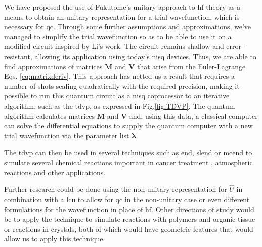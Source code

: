 \documentclass{aux/ttuthes2007}
\begin{document}
We have proposed the use of Fukutome's  unitary approach to \gls{hf} theory as a means to obtain an unitary representation for a trial wavefunction, which is necessary for \gls{qc}.
Through some further assumptions and approximations, we've managed to simplify the trial wavefunction so as to be able to use it on a modified circuit inspired by Li's  work. The circuit remains shallow and error-resistant, allowing its application using today's \gls{nisq} devices.
Thus, we are able to find approximations of matrices $\bm M$ and $\bm V$ that arise from the Euler-Lagrange Eqs. \ref{eq:matrixderiv}.
This approach has netted us a result that requires a number of shots scaling quadratically with the required precision, making it possible to run this quantum circuit as a \gls{nisq} coprocessor to an iterative algorithm, such as the \gls{tdvp}, as expressed in Fig.\ref{fig:TDVP}.
The quantum algorithm calculates matrices $\bm M$ and $\bm V$ and, using this data, a classical computer can solve the differential equations to supply the quantum computer with a new trial wavefunction via the parameter list $\bm \lambda$.

The \gls{tdvp} can then be used in several techniques such as \gls{end}, \gls{slend} or \gls{mcend} to simulate several chemical reactions important in cancer treatment , atmospheric reactions  and other applications.

Further research could be done using the non-unitary representation for $\hat U$ in combination with a \gls{lcu} to allow for \gls{qc} in the non-unitary case or even different formulations for the wavefunction in place of \gls{hf}.
Other directions of study would be to apply the technique to simulate reactions with polymers and organic tissue or reactions in crystals, both of which would have geometric features that would allow us to apply this technique.
\backmatter





\glsaddall

\printnoidxglossary[type=acronym,sort=letter,title=\textbf{Acronyms}]
\end{document}
